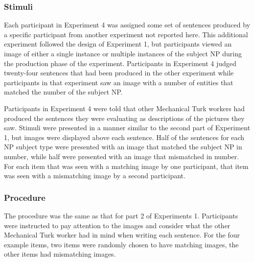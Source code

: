 \documentclass[10pt,letterpaper]{article}
\begin{document}
\subsubsection{Stimuli}

Each participant in Experiment 4 was assigned some set of sentences produced by a specific participant from another experiment not reported here. This additional experiment followed the design of Experiment 1, but participants viewed an image of either a single instance or multiple instances of the subject NP during the production phase of the experiment. Participants in Experiment 4 judged twenty-four sentences that had been produced in the other experiment while participants in that experiment saw an image with a number of entities that matched the number of the subject NP.

Participants in Experiment 4 were told that other Mechanical Turk workers had produced the sentences they were evaluating as descriptions of the pictures they saw. Stimuli were presented in a manner similar to the second part of Experiment 1, but images were displayed above each sentence. Half of the sentences for each NP subject type were presented with an image that matched the subject NP in number, while half were presented with an image that mismatched in number. For each item that was seen with a matching image by one participant, that item was seen with a mismatching image by a second participant.

\subsubsection{Procedure}

The procedure was the same as that for part 2 of Experiments 1. Participants were instructed to pay attention to the images and consider what the other Mechanical Turk worker had in mind when writing each sentence. For the four example items, two items were randomly chosen to have matching images, the other items had mismatching images.

\end{document}
